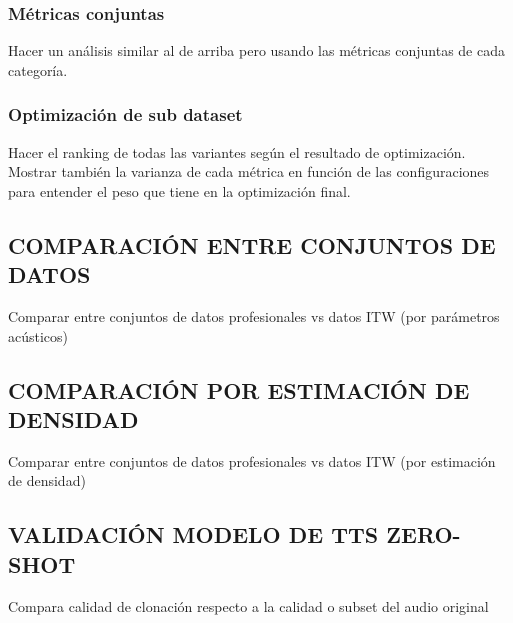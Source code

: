 \subsubsection{Métricas conjuntas}
Hacer un análisis similar al de arriba pero usando las métricas conjuntas de cada categoría. 

\subsubsection{Optimización de sub dataset}
Hacer el ranking de todas las variantes según el resultado de optimización. Mostrar también la varianza de cada métrica en función de las configuraciones para entender el peso que tiene en la optimización final.

\subsection{COMPARACIÓN ENTRE CONJUNTOS DE DATOS}
Comparar entre conjuntos de datos profesionales vs datos ITW (por parámetros acústicos)

\subsection{COMPARACIÓN POR ESTIMACIÓN DE DENSIDAD}
Comparar entre conjuntos de datos profesionales vs datos ITW (por estimación de densidad)

\subsection{VALIDACIÓN MODELO DE TTS ZERO-SHOT}
Compara calidad de clonación respecto a la calidad o subset del audio original
